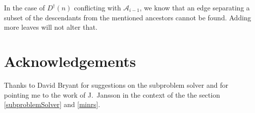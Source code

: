 \documentclass[11pt]{article}
\begin{document}
In the case of $D^{\dag}(n)$ conflicting with $\mathcal{A}_{i-1}$, we know
that an edge separating a subset of the descendants from the mentioned
ancestors cannot be found. Adding more leaves will not alter that.





\section{Acknowledgements}
Thanks to David Bryant for suggestions on the subproblem solver and
    for pointing me to the work of J.~Jansson in the context of the 
    the section \ref{subproblemSolver} and \ref{minrs}.




\end{document}
